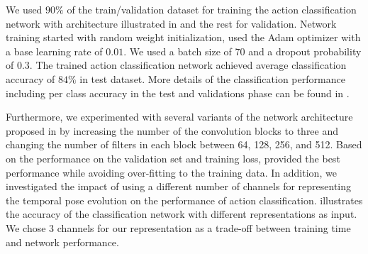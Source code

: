 We used $90\%$ of the train/validation dataset for training the action classification network with architecture illustrated in  and the rest for validation. Network training started with random weight initialization, used the Adam optimizer with a base learning rate of $0.01$. We used a batch size of $70$ and a dropout probability of $0.3$. The trained action classification network achieved average classification accuracy of $84\%$ in test dataset. More details of the classification performance including per class accuracy in the test and validations phase can be found in .
\Cmat
\chStat

Furthermore, we experimented with several variants of the network architecture proposed in  by increasing the number of the convolution blocks to three and changing the number of filters in each block between 64, 128, 256, and 512. Based on the performance on the validation set and training loss,  provided the best performance while avoiding over-fitting to the training data. In addition, we investigated the impact of using a different number of channels for representing the temporal pose evolution on the performance of action classification.  illustrates the accuracy of the classification network with different representations as input. We chose 3 channels for our representation as a trade-off between training time and network performance.